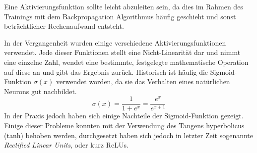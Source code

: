 Eine Aktivierungsfunktion sollte leicht abzuleiten sein, 
da dies im Rahmen des Trainings mit dem Backpropagation Algorithmus häufig geschieht 
und sonst beträchtlicher Rechenaufwand entsteht.

In der Vergangenheit wurden einige verschiedene Aktivierungsfunktionen verwendet.
Jede dieser Funktionen stellt eine Nicht-Linearität dar und nimmt eine einzelne Zahl, wendet eine bestimmte, festgelegte mathematische 
Operation auf diese an und gibt das Ergebnis zurück.
Historisch ist häufig die Sigmoid-Funktion \(\sigma(x)\) verwendet worden, da sie das Verhalten eines natürlichen Neurons gut nachbildet.
\begin{equation}
	\sigma(x) = \frac{1}{1 + e^x} = \frac{e^x}{e^{x + 1}}
	\label{func:Sigmoid}
\end{equation}
In der Praxis jedoch haben sich einige Nachteile der Sigmoid-Funktion gezeigt.
Einige dieser Probleme konnten mit der Verwendung des Tangens hyperbolicus (tanh) behoben werden, 
durchgesetzt haben sich jedoch in letzter Zeit sogenannte \textit{Rectified Linear Units}, oder kurz ReLUs.

	
	
